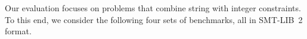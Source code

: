 %
%
% 

Our evaluation focuses on problems that combine string with integer constraints.  To this end, we consider the following four sets of
benchmarks, all in SMT-LIB~2 format.

